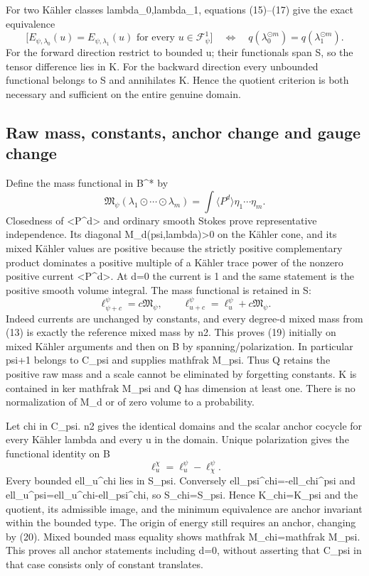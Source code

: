 \documentclass[
]{article}
\begin{document}
For two Kähler classes lambda\_0,lambda\_1, equations (15)--(17) give
the exact equivalence \[
\big[E_{\psi,\lambda_0}(u)=E_{\psi,\lambda_1}(u)
\text{ for every }u\in\mathcal{F}^1_\psi\big]
\quad\Longleftrightarrow\quad
q(\lambda_0^{\odot m})=q(\lambda_1^{\odot m}).\tag{18}
\] For the forward direction restrict to bounded u; their functionals
span S, so the tensor difference lies in K. For the backward direction
every unbounded functional belongs to S and annihilates K. Hence the
quotient criterion is both necessary and sufficient on the entire
genuine domain.

\subsection{Raw mass, constants, anchor change and gauge
change}\label{raw-mass-constants-anchor-change-and-gauge-change}

Define the mass functional in B\^{}* by \[
\mathfrak M_\psi(\lambda_1\odot\cdots\odot\lambda_m)
=\int\langle P^d\rangle\eta_1\cdots\eta_m.
\] Closedness of \textless P\^{}d\textgreater{} and ordinary smooth
Stokes prove representative independence. Its diagonal
M\_d(psi,lambda)\textgreater0 on the Kähler cone, and its mixed Kähler
values are positive because the strictly positive complementary product
dominates a positive multiple of a Kähler trace power of the nonzero
positive current \textless P\^{}d\textgreater. At d=0 the current is 1
and the same statement is the positive smooth volume integral. The mass
functional is retained in S: \[
\ell_{\psi+c}^\psi=c\mathfrak M_\psi,\qquad
\ell_{u+c}^\psi=\ell_u^\psi+c\mathfrak M_\psi.\tag{19}
\] Indeed currents are unchanged by constants, and every degree-d mixed
mass from (13) is exactly the reference mixed mass by n2. This proves
(19) initially on mixed Kähler arguments and then on B by
spanning/polarization. In particular psi+1 belongs to C\_psi and
supplies mathfrak M\_psi. Thus Q retains the positive raw mass and a
scale cannot be eliminated by forgetting constants. K is contained in
ker mathfrak M\_psi and Q has dimension at least one. There is no
normalization of M\_d or of zero volume to a probability.

Let chi in C\_psi. n2 gives the identical domains and the scalar anchor
cocycle for every Kähler lambda and every u in the domain. Unique
polarization gives the functional identity on B \[
\ell_u^\chi=\ell_u^\psi-\ell_\chi^\psi.\tag{20}
\] Every bounded ell\_u\^{}chi lies in S\_psi. Conversely
ell\_psi\^{}chi=-ell\_chi\^{}psi and
ell\_u\^{}psi=ell\_u\^{}chi-ell\_psi\^{}chi, so S\_chi=S\_psi. Hence
K\_chi=K\_psi and the quotient, its admissible image, and the minimum
equivalence are anchor invariant within the bounded type. The origin of
energy still requires an anchor, changing by (20). Mixed bounded mass
equality shows mathfrak M\_chi=mathfrak M\_psi. This proves all anchor
statements including d=0, without asserting that C\_psi in that case
consists only of constant translates.
\end{document}
